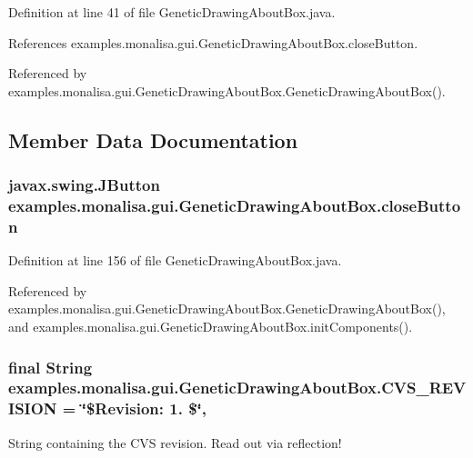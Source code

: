 Definition at line 41 of file Genetic\-Drawing\-About\-Box.\-java.



References examples.\-monalisa.\-gui.\-Genetic\-Drawing\-About\-Box.\-close\-Button.



Referenced by examples.\-monalisa.\-gui.\-Genetic\-Drawing\-About\-Box.\-Genetic\-Drawing\-About\-Box().



\subsection{Member Data Documentation}
\hypertarget{classexamples_1_1monalisa_1_1gui_1_1_genetic_drawing_about_box_abb14e6c034140c5f411b2c32d2983bfc}{
\subsubsection[{close\-Button}]{\setlength{\rightskip}{0pt plus 5cm}javax.\-swing.\-J\-Button examples.\-monalisa.\-gui.\-Genetic\-Drawing\-About\-Box.\-close\-Button\hspace{0.3cm}{\ttfamily [private]}}}\label{classexamples_1_1monalisa_1_1gui_1_1_genetic_drawing_about_box_abb14e6c034140c5f411b2c32d2983bfc}


Definition at line 156 of file Genetic\-Drawing\-About\-Box.\-java.



Referenced by examples.\-monalisa.\-gui.\-Genetic\-Drawing\-About\-Box.\-Genetic\-Drawing\-About\-Box(), and examples.\-monalisa.\-gui.\-Genetic\-Drawing\-About\-Box.\-init\-Components().

\hypertarget{classexamples_1_1monalisa_1_1gui_1_1_genetic_drawing_about_box_acf1e5dd90b4900deb131719cd0c59b89}{
\subsubsection[{C\-V\-S\-\_\-\-R\-E\-V\-I\-S\-I\-O\-N}]{\setlength{\rightskip}{0pt plus 5cm}final String examples.\-monalisa.\-gui.\-Genetic\-Drawing\-About\-Box.\-C\-V\-S\-\_\-\-R\-E\-V\-I\-S\-I\-O\-N = \char`\"{}\$Revision\-: 1. \$\char`\"{}\hspace{0.3cm}{\ttfamily [static]}, {\ttfamily [private]}}}\label{classexamples_1_1monalisa_1_1gui_1_1_genetic_drawing_about_box_acf1e5dd90b4900deb131719cd0c59b89}
String containing the C\-V\-S revision. Read out via reflection! 

